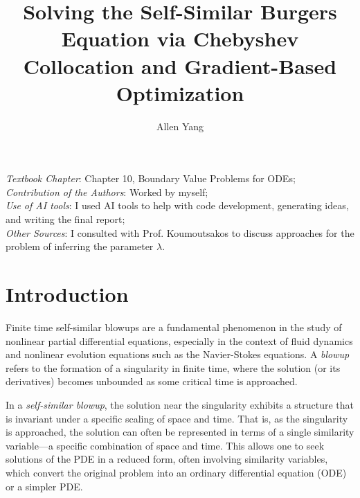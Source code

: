 \documentclass[12pt]{article}
\title{Solving the Self-Similar Burgers Equation 
via Chebyshev Collocation and Gradient-Based Optimization}
\author{Allen Yang}
\theoremstyle{definition}\newtheorem{lemma}{Lemma}
\begin{document}
\maketitle
\noindent\textit{Textbook Chapter}: Chapter 10, Boundary Value Problems for ODEs;\\
\textit{Contribution of the Authors}: Worked by myself;\\
\textit{Use of AI tools}: I used AI tools to help with code development, generating ideas, and writing the final report;\\
\textit{Other Sources}: I consulted with Prof. Koumoutsakos to discuss approaches for the problem of inferring the parameter $\lambda$.
\newpage
\section{\label{sec:introduction}Introduction}
Finite time self-similar blowups are a fundamental phenomenon in the study of nonlinear partial differential equations, especially in the context of fluid dynamics and nonlinear evolution equations such as the Navier-Stokes equations. A \textit{blowup} refers to the formation of a singularity in finite time, where the solution (or its derivatives) becomes unbounded as some critical time is approached.

In a \textit{self-similar blowup}, the solution near the singularity exhibits a structure that is invariant under a specific scaling of space and time. 
That is, as the singularity is approached, the solution can often be represented in terms of a single similarity variable—a specific combination of space and time.
This allows one to seek solutions of the PDE in a reduced form, often involving similarity variables, which convert the original problem into an ordinary differential equation (ODE) or a simpler PDE.
\end{document}
